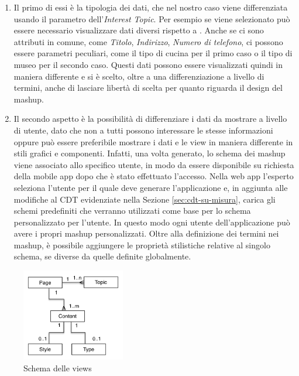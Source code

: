 \begin{enumerate}
	\item Il primo di essi è la tipologia dei dati, che nel nostro caso viene differenziata usando il parametro dell'\emph{Interest Topic}.
	Per esempio se viene selezionato  può essere necessario visualizzare dati diversi rispetto a . Anche se ci sono attributi in comune, come \emph{Titolo}, \emph{Indirizzo}, \emph{Numero di telefono}, ci possono essere parametri peculiari, come il tipo di cucina per il primo caso o il tipo di museo per il secondo caso. Questi dati possono essere visualizzati quindi in maniera differente e si è scelto, oltre a una differenziazione a livello di termini, anche di lasciare libertà di scelta per quanto riguarda il design del mashup. 
	\item
	Il secondo aspetto è la possibilità di differenziare i dati da mostrare a livello di utente, dato che non a tutti possono interessare le stesse informazioni oppure può essere preferibile mostrare i dati e le view in maniera differente in stili grafici e componenti. Infatti, una volta generato, lo schema dei mashup viene associato allo specifico utente, in modo da essere disponibile su richiesta della mobile app dopo che è stato effettuato l'accesso.
	Nella web app l'esperto seleziona l'utente per il quale deve generare l'applicazione e, in aggiunta alle modifiche al CDT evidenziate nella Sezione \ref{sec:cdt-su-misura}, carica gli schemi predefiniti che verranno utilizzati come base per lo schema personalizzato per l'utente. In questo modo ogni utente dell'applicazione può avere i propri mashup personalizzati.
	Oltre alla definizione dei termini nei mashup, è possibile aggiungere le proprietà stilistiche relative al singolo schema, se diverse da quelle definite globalmente.
\end{enumerate}

\begin{figure}[ht]
	\centering
	\includegraphics[width=0.4\textwidth]{4-metodologia/Immagini/view-schema.png}
	\caption{Schema delle views}\label{fig:view-schema}
\end{figure}

